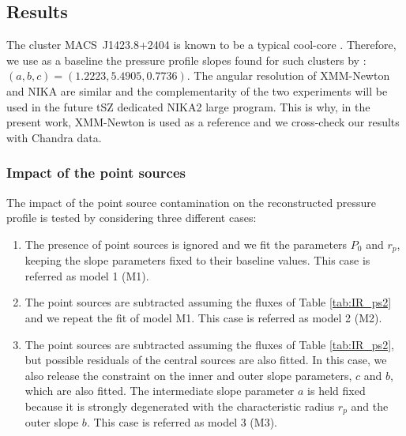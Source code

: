 \documentclass[twocolumn,traditabstract]{aa}
\begin{document}
\subsection{Results}
The cluster \mbox{MACS~J1423.8+2404} is known to be a typical cool-core \citep[e.g.][]{kartaltepe2008}. Therefore, we use as a baseline the pressure profile slopes found for such clusters by \cite{arnaud2010}: $\left(a,b,c\right) = \left(1.2223, 5.4905, 0.7736\right)$. The angular resolution of XMM-Newton and NIKA are similar and the complementarity of the two experiments will be used in the future tSZ dedicated NIKA2 large program. This is why, in the present work, XMM-Newton is used as a reference and we cross-check our results with Chandra data.

\subsubsection{Impact of the point sources}
The impact of the point source contamination on the reconstructed pressure profile is tested by considering three different cases: 
\begin{enumerate}
\item The presence of point sources is ignored and we fit the parameters $P_0$ and $r_p$, keeping the slope parameters fixed to their baseline values. This case is referred as model 1 (M1).
\item The point sources are subtracted assuming the fluxes of Table \ref{tab:IR_ps2} and we repeat the fit of model M1. This case is referred as model 2 (M2).
\item The point sources are subtracted assuming the fluxes of Table \ref{tab:IR_ps2}, but possible residuals of the central sources are also fitted. In this case, we also release the constraint on the inner and outer slope parameters, $c$ and $b$, which are also fitted. The intermediate slope parameter $a$ is held fixed because it is strongly degenerated with the characteristic radius $r_p$ and the outer slope $b$. This case is referred as model 3 (M3).
\end{enumerate}
\end{document}
